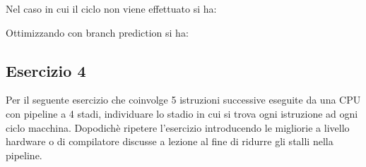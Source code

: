 \documentclass[a4paper]{article}
\theoremstyle{break}
\theoremstyle{break}
\theoremstyle{break}
\theoremstyle{break}
\begin{document}
\vspace{1em}
\noindent Nel caso in cui il ciclo non viene effettuato si ha:
\begin{table}[H]
  \centering
\end{table}

\vspace{1em}
\noindent Ottimizzando con branch prediction si ha:
\begin{table}[H]
  \centering
\end{table}


\subsection{Esercizio 4}
Per il seguente esercizio che coinvolge 5 istruzioni successive eseguite da una CPU con pipeline a 4 stadi, individuare lo stadio in cui si trova ogni istruzione ad ogni ciclo macchina.
Dopodichè ripetere l'esercizio introducendo le migliorie a livello hardware o di compilatore discusse a lezione al fine di ridurre gli stalli nella pipeline.
\end{document}
